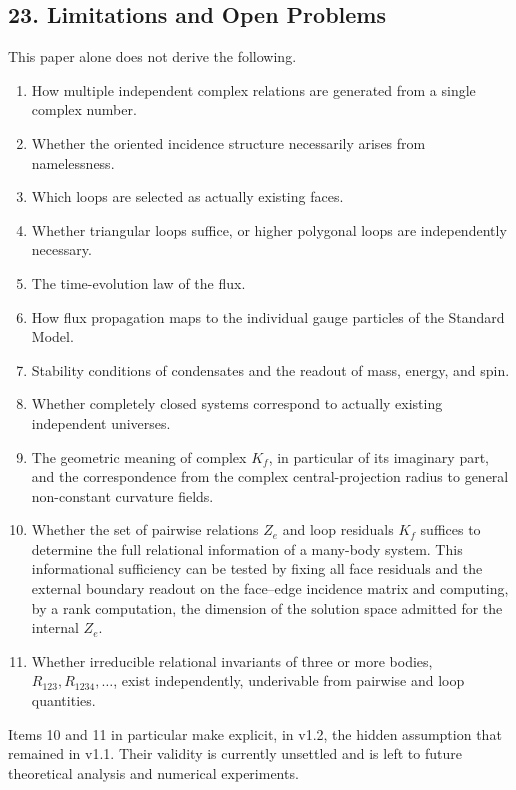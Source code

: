 \documentclass[
  a4paper,
]{article}
\providecommand{\tightlist}{%
  \setlength{\itemsep}{0pt}\setlength{\parskip}{0pt}}
\begin{document}
\subsection{23. Limitations and Open
Problems}\label{limitations-and-open-problems}

This paper alone does not derive the following.

\begin{enumerate}
\def\labelenumi{\arabic{enumi}.}
\tightlist
\item
  How multiple independent complex relations are generated from a single
  complex number.
\item
  Whether the oriented incidence structure necessarily arises from
  namelessness.
\item
  Which loops are selected as actually existing faces.
\item
  Whether triangular loops suffice, or higher polygonal loops are
  independently necessary.
\item
  The time-evolution law of the flux.
\item
  How flux propagation maps to the individual gauge particles of the
  Standard Model.
\item
  Stability conditions of condensates and the readout of mass, energy,
  and spin.
\item
  Whether completely closed systems correspond to actually existing
  independent universes.
\item
  The geometric meaning of complex \(K_f\), in particular of its
  imaginary part, and the correspondence from the complex
  central-projection radius to general non-constant curvature fields.
\item
  Whether the set of pairwise relations \(Z_e\) and loop residuals
  \(K_f\) suffices to determine the full relational information of a
  many-body system. This informational sufficiency can be tested by
  fixing all face residuals and the external boundary readout on the
  face--edge incidence matrix and computing, by a rank computation, the
  dimension of the solution space admitted for the internal \(Z_e\).
\item
  Whether irreducible relational invariants of three or more bodies,
  \(R_{123},R_{1234},\ldots\), exist independently, underivable from
  pairwise and loop quantities.
\end{enumerate}

Items 10 and 11 in particular make explicit, in v1.2, the hidden
assumption that remained in v1.1. Their validity is currently unsettled
and is left to future theoretical analysis and numerical experiments.
\end{document}
